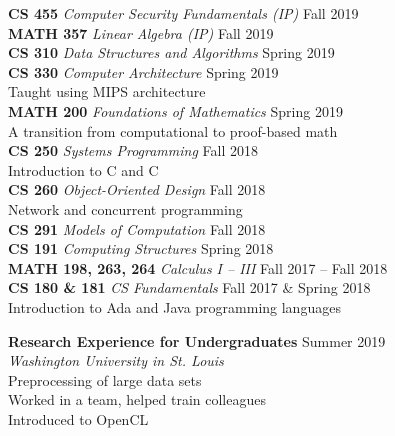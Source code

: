 \documentclass[10pt,letterpaper,ragged2e]{altacv}
\def\CC{{C\nolinebreak\hspace{-.05em}\raisebox{.05ex}{+\hspace{-0.075ex}+}}}
\begin{document}
\textbf{CS 455} \textit{Computer Security Fundamentals (IP)} \hfill Fall 2019\vspace{0.5ex}\\
\textbf{MATH 357} \textit{Linear Algebra (IP)} \hfill Fall 2019\vspace{0.5ex}\\
\textbf{CS 310} \textit{Data Structures and Algorithms} \hfill Spring 2019\vspace{0.5ex}\\
\textbf{CS 330} \textit{Computer Architecture} \hfill Spring 2019\\
\hspace{1em}Taught using MIPS architecture\vspace{0.5ex}\\
\textbf{MATH 200} \textit{Foundations of Mathematics} \hfill Spring 2019\\
\hspace{1em}A transition from computational to proof-based math\vspace{0.5ex}\\
\textbf{CS 250} \textit{Systems Programming} \hfill Fall 2018\\
\hspace{1em}Introduction to C and \CC\vspace{0.5ex}\\
\textbf{CS 260} \textit{Object-Oriented Design} \hfill Fall 2018\\
\hspace{1em}Network and concurrent programming\vspace{0.5ex}\\
\textbf{CS 291} \textit{Models of Computation} \hfill Fall 2018\vspace{0.5ex}\\
\textbf{CS 191} \textit{Computing Structures} \hfill Spring 2018\vspace{0.5ex}\\
\textbf{MATH 198, 263, 264} \textit{Calculus I -- III} \hfill Fall 2017 -- Fall 2018\vspace{0.5ex}\\
\textbf{CS 180 \& 181} \textit{CS Fundamentals} \hfill Fall 2017 \& Spring 2018\\
\hspace{1em}Introduction to Ada and Java programming languages


\textbf{Research Experience for Undergraduates} \hfill Summer 2019\\
\textit{Washington University in St. Louis}\\
\hspace{1em}Preprocessing of large data sets\\
\hspace{1em}Worked in a team, helped train colleagues\\
 \hspace{1em}Introduced to OpenCL\\
\end{document}
